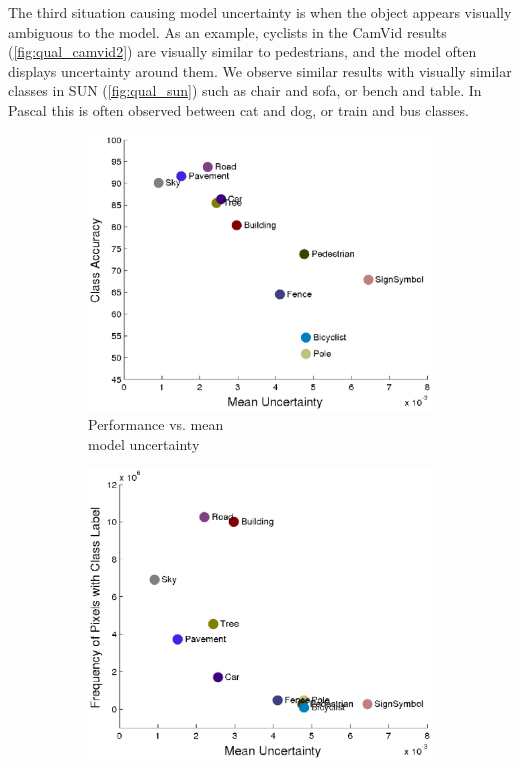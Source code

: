 The third situation causing model uncertainty is when the object appears visually ambiguous to the model. As an example, cyclists in the CamVid results (\cref{fig:qual_camvid2}) are visually similar to pedestrians, and the model often displays uncertainty around them. We observe similar results with visually similar classes in SUN (\cref{fig:qual_sun}) such as chair and sofa, or bench and table. In Pascal this is often observed between cat and dog, or train and bus classes.

\begin{figure}[t]
    \centering
    \begin{subfigure}[t]{0.45\linewidth}
        \centering
        \includegraphics[width=\linewidth]{scatter_camvid.eps}
        \caption{Performance vs. mean\\model uncertainty}
        \label{fig:unc_acc2}
    \end{subfigure}
    \begin{subfigure}[t]{0.45\linewidth}
        \centering
        \includegraphics[width=\linewidth]{scatter_camvid_freq.eps}

\end{subfigure}
\end{figure}
